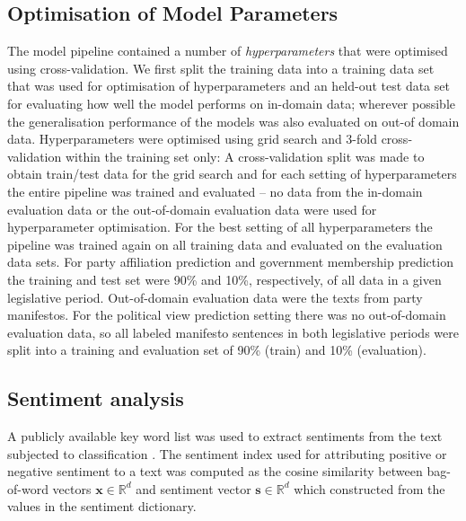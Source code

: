 \documentclass[runningheads,a4paper]{llncs}
\renewcommand{\vec}[1]{\mathbf{#1}}
\newcommand{\R}{\mathds{R}}
\begin{document}
\subsection{Optimisation of Model Parameters}\label{sec:crossvalidation}
The model pipeline contained a number of {\em hyperparameters} that were optimised using cross-validation.  
We first split the training data into a training data set that was used for optimisation of hyperparameters and an held-out test data set for evaluating how well the model performs on in-domain data; wherever possible the generalisation performance of the models was also evaluated on out-of domain data. Hyperparameters were optimised using grid search and 3-fold cross-validation within the training set only: A cross-validation split was made to obtain train/test data for the grid search and for each setting of hyperparameters the entire pipeline was trained and evaluated -- no data from the in-domain evaluation data or the out-of-domain evaluation data were used for hyperparameter optimisation. For the best setting of all hyperparameters the pipeline was trained again on all training data and evaluated on the evaluation data sets. For party affiliation prediction and government membership prediction the training and test set were 90\% and 10\%, respectively, of all data in a given legislative period. Out-of-domain evaluation data were the texts from party manifestos. For the political view prediction setting there was no out-of-domain evaluation data, so all labeled manifesto sentences in both legislative periods were split into a training and evaluation set of 90\% (train) and 10\% (evaluation). 

\subsection{Sentiment analysis}\label{sec:sentiment_analysis_methods}
A publicly available key word list was used to extract sentiments from the text subjected to classification \cite{remquahey2010}. The sentiment index used for attributing positive or negative sentiment to a text was computed as the cosine similarity between bag-of-word vectors $\vec{x}\in\R^d$ and sentiment vector $\vec{s}\in\R^d$ which constructed from the values in the sentiment dictionary. 
\end{document}

